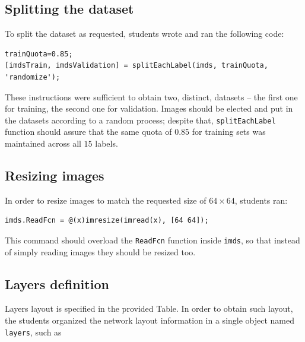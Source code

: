 \documentclass[a4paper, 11pt]{article} %
\begin{document}
\subsection{Splitting the dataset}

To split the dataset as requested, students wrote and ran the following code:

\begin{lstlisting}
trainQuota=0.85;
[imdsTrain, imdsValidation] = splitEachLabel(imds, trainQuota, 'randomize');
\end{lstlisting}

These instructions were sufficient to obtain two, distinct, datasets \--- the first one for training, the second one for validation. Images should be elected and put in the datasets according to a random process; despite that, \texttt{splitEachLabel} function should assure that the same quota of $0.85$ for training sets was maintained across all $15$ labels.

\subsection{Resizing images}

In order to resize images to match the requested size of $64 \times 64$, students ran:

\begin{lstlisting} 
imds.ReadFcn = @(x)imresize(imread(x), [64 64]);
\end{lstlisting}

This command should overload the \texttt{ReadFcn} function inside \texttt{imds}, so that instead of simply reading images they should be resized too.

\subsection{Layers definition}

Layers layout is specified in the provided Table. In order to obtain such layout, the students organized the network layout information in a single object named \texttt{layers}, such as
\end{document}

